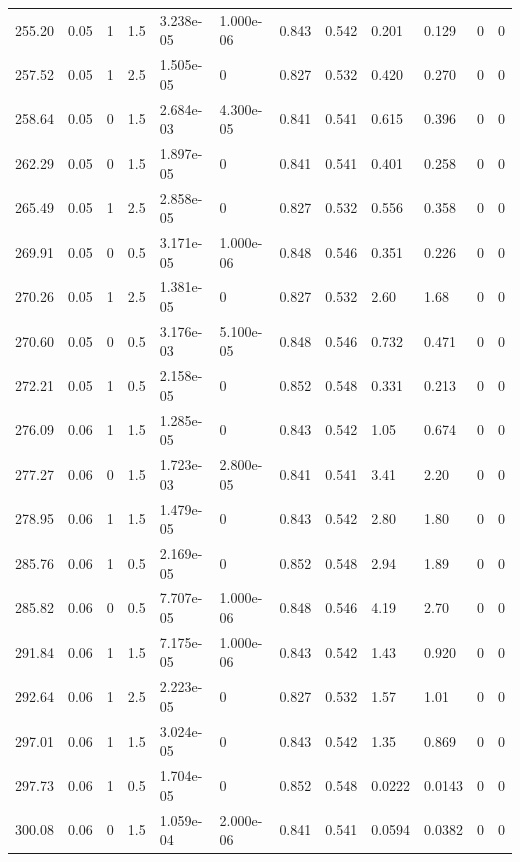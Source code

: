 \documentclass[preview]{standalone}
\begin{document}
{{{\begin{tabular}{L{1.2cm}C{1.2cm} C{0.3cm}C{0.5cm} C{1.4cm}C{1.4cm} C{1.4cm}C{1.4cm} C{1.6cm}C{1.6cm} C{1.6cm}C{1.6cm}}
  255.20  &  0.05  & 1     & 1.5 &  3.238e-05  & 1.000e-06  &  0.843&   0.542& 0.201 & 0.129   &  0 & 0  \\ 
  257.52  &  0.05  & 1     & 2.5 &  1.505e-05  & 0  &  0.827&   0.532& 0.420 & 0.270   &  0 & 0  \\ 
  258.64  &  0.05  & 0     & 1.5 &  2.684e-03  & 4.300e-05  &  0.841&   0.541& 0.615 & 0.396   &  0 & 0  \\ 
  262.29  &  0.05  & 0     & 1.5 &  1.897e-05  & 0  &  0.841&   0.541& 0.401 & 0.258   &  0 & 0  \\ 
  265.49  &  0.05  & 1     & 2.5 &  2.858e-05  & 0  &  0.827&   0.532& 0.556 & 0.358   &  0 & 0  \\ 
  269.91  &  0.05  & 0     & 0.5 &  3.171e-05  & 1.000e-06  &  0.848&   0.546& 0.351 & 0.226   &  0 & 0  \\ 
  270.26  &  0.05  & 1     & 2.5 &  1.381e-05  & 0  &  0.827&   0.532& 2.60 & 1.68   &  0 & 0  \\ 
  270.60  &  0.05  & 0     & 0.5 &  3.176e-03  & 5.100e-05  &  0.848&   0.546& 0.732 & 0.471   &  0 & 0  \\ 
  272.21  &  0.05  & 1     & 0.5 &  2.158e-05  & 0  &  0.852&   0.548& 0.331 & 0.213   &  0 & 0  \\ 
  276.09  &  0.06  & 1     & 1.5 &  1.285e-05  & 0  &  0.843&   0.542& 1.05 & 0.674   &  0 & 0  \\ 
  277.27  &  0.06  & 0     & 1.5 &  1.723e-03  & 2.800e-05  &  0.841&   0.541& 3.41 & 2.20   &  0 & 0  \\ 
  278.95  &  0.06  & 1     & 1.5 &  1.479e-05  & 0  &  0.843&   0.542& 2.80 & 1.80   &  0 & 0  \\ 
  285.76  &  0.06  & 1     & 0.5 &  2.169e-05  & 0  &  0.852&   0.548& 2.94 & 1.89   &  0 & 0  \\ 
  285.82  &  0.06  & 0     & 0.5 &  7.707e-05  & 1.000e-06  &  0.848&   0.546& 4.19 & 2.70   &  0 & 0  \\ 
  291.84  &  0.06  & 1     & 1.5 &  7.175e-05  & 1.000e-06  &  0.843&   0.542& 1.43 & 0.920   &  0 & 0  \\ 
  292.64  &  0.06  & 1     & 2.5 &  2.223e-05  & 0  &  0.827&   0.532& 1.57 & 1.01   &  0 & 0  \\ 
  297.01  &  0.06  & 1     & 1.5 &  3.024e-05  & 0  &  0.843&   0.542& 1.35 & 0.869   &  0 & 0  \\ 
  297.73  &  0.06  & 1     & 0.5 &  1.704e-05  & 0  &  0.852&   0.548& 0.0222 & 0.0143   &  0 & 0  \\ 
  300.08  &  0.06  & 0     & 1.5 &  1.059e-04  & 2.000e-06  &  0.841&   0.541& 0.0594 & 0.0382   &  0 & 0  \\ 

\end{tabular}}}}
\end{document}
